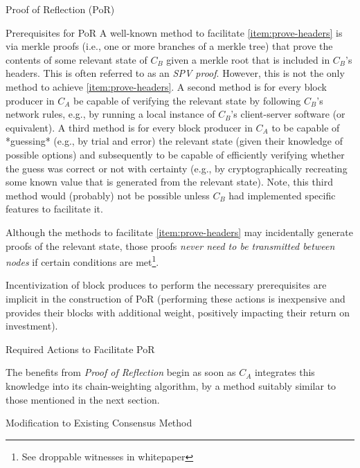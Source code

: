 \documentclass[a4paper,]{article}
\begin{document}
\begin{section}{Proof of Reflection (PoR)}
\begin{subsection}{Prerequisites for PoR}
     A well-known method to facilitate \autoref{item:prove-headers} is via merkle proofs (i.e., one or more branches of a merkle tree) that prove the contents of some relevant state of $C_B$ given a merkle root that is included in $C_B$'s headers. This is often referred to as an \emph{SPV proof}. However, this is not the only method to achieve \autoref{item:prove-headers}. A second method is for every block producer in $C_A$ be capable of verifying the relevant state by following $C_B$'s network rules, e.g., by running a local instance of $C_B$'s client-server software (or equivalent). A third method is for every block producer in $C_A$ to be capable of *guessing* (e.g., by trial and error) the relevant state (given their knowledge of possible options) and subsequently to be capable of efficiently verifying whether the guess was correct or not with certainty (e.g., by cryptographically recreating some known value that is generated from the relevant state). Note, this third method would (probably) not be possible unless $C_B$ had implemented specific features to facilitate it.

     Although the methods to facilitate \autoref{item:prove-headers} may incidentally generate proofs of the relevant state, those proofs \emph{never need to be transmitted between nodes} if certain conditions are met\footnote{See droppable witnesses in whitepaper}.

     Incentivization of block produces to perform the necessary prerequisites are implicit in the construction of PoR (performing these actions is inexpensive and provides their blocks with additional weight, positively impacting their return on investment).

 \end{subsection}
 \begin{subsection}{Required Actions to Facilitate PoR}

    The benefits from \emph{Proof of Reflection} begin as soon as $C_A$ integrates this knowledge into its chain-weighting algorithm, by a method suitably similar to those mentioned in the next section.

 \end{subsection}
 \begin{subsection}{Modification to Existing Consensus Method}


\end{subsection}
\end{section}
\end{document}

